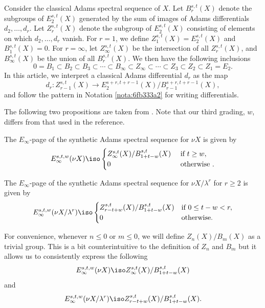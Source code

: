 \documentclass{amsart}
\numberwithin{equation}{section}
\begin{document}
\begin{notation}
    Consider the classical Adams spectral sequence of $X$. Let $B_r^{s,t}(X)$ denote the subgroups of $E_2^{s,t}(X)$ generated by the sum of images of Adams differentials $d_2,\dots,d_r$. Let $Z_r^{s,t}(X)$ denote the subgroup of $E_2^{s,t}(X)$ consisting of elements on which $d_2,\dots,d_r$ vanish. For $r=1$, we define $Z_1^{s,t}(X)=E_2^{s,t}(X)$ and $B_1^{s,t}(X)=0$. For $r=\infty$, let $Z_\infty^{s,t}(X)$ be the intersection of all $Z_r^{s,t}(X)$, and $B_\infty^{s,t}(X)$ be the union of all $B_r^{s,t}(X)$. We then have the following inclusions
    $$0 = B_1 \subset B_2\subset B_3\subset \cdots\subset B_\infty\subset Z_\infty \subset \cdots\subset Z_3\subset Z_2\subset Z_1 = E_2.$$
    In this article, we interpret a classical Adams differential $d_r$ as the map
    $$d_r: Z_{r-1}^{s,t}(X)\to E_2^{s+r,t+r-1}(X)/B_{r-1}^{s+r,t+r-1}(X),$$
    and follow the pattern in Notation \ref{nota:6fb333a2} for writing differentials.
\end{notation}

The following two propositions are taken from \cite[Corollary A.9, A.11]{BHS}. Note that our third grading, $w$, differs from that used in the reference.

\begin{proposition}\label{prop:30e8b746}
    The $E_\infty$-page of the synthetic Adams spectral sequence for $\nu X$ is given by
    $$E_\infty^{s,t,w}(\nu X)\iso\begin{cases}
        Z_\infty^{s,t}(X)/B_{1+t-w}^{s,t}(X) & \text{ if } t \ge w,\\
        0 & \text{ otherwise }.
    \end{cases}$$
\end{proposition}

\begin{proposition}\label{prop:59f111f}
    The $E_\infty$-page of the synthetic Adams spectral sequence for $\nu X/\lambda^r$ for $r\ge 2$ is given by
    $$E_\infty^{s,t,w}(\nu X/\lambda^r)\iso\begin{cases}
        Z_{r-t+w}^{s,t}(X)/B_{1+t-w}^{s,t}(X) & \text{if } 0\le t-w < r,\\
        0 & \text{otherwise}.
    \end{cases}$$
\end{proposition}

\begin{notation}
    For convenience, whenever $n\le 0$ or $m\le 0$, we will define $Z_n(X)/B_m(X)$ as a trivial group. This is a bit counterintuitive to the definition of $Z_n$ and $B_m$ but it allows us to consistently express the following
    $$E_\infty^{s,t,w}(\nu X)\iso Z_\infty^{s,t}(X)/B_{1+t-w}^{s,t}(X)$$
    and
    $$E_\infty^{s,t,w}(\nu X/\lambda^r)\iso Z_{r-t+w}^{s,t}(X)/B_{1+t-w}^{s,t}(X).$$
\end{notation}
\end{document}

